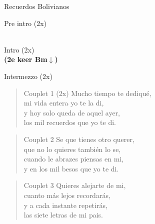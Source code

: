 \begin{song}[huayno]{Recuerdos Bolivianos}

\begin{instrumental}{Pre intro (2x)}
   \\
   \\
\end{instrumental}

\begin{instrumental}{Intro (2x)}
   \\
   
\textbf{(2e keer Bm$\downarrow$)}\\
\end{instrumental}

\begin{instrumental}{Intermezzo (2x)}
    \\
    
\end{instrumental}

\begin{verse}{Couplet 1 (2x)}
Mucho tiempo te dediqué,\\
mi vida entera yo te la di,\\
y hoy solo queda de aquel ayer,\\
los mil recuerdos que yo te di.
\end{verse}

\begin{verse}{Couplet 2}
Se que tienes otro querer,\\
que no lo quieres también lo se,\\
cuando le abrazes piensas en mi,\\
y en los mil besos que yo te di.
\end{verse}

\begin{verse}{Couplet 3}
Quieres alejarte de mi,\\
cuanto más lejos recordarás,\\
y a cada instante repetirás,\\
las siete letras de mi pais.
\end{verse}


\end{song}

